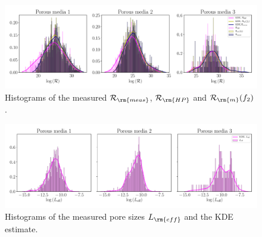 \documentclass[draft,jgrga]{agutexSI2019}
\begin{document}
\begin{figure}
\noindent\includegraphics[width=15cm]{figures/hydraulic_resistance_integrated_histogram.pdf}
\caption{Histograms of the measured $\mathcal{R}_{\rm{meas}}$, $\mathcal{R}_{\rm{HP}}$ and $\mathcal{R}_{\rm{m}}(f_2)$ . }\label{Fig:Hist_1}
\end{figure}

\begin{figure}
\noindent\includegraphics[width=15cm]{figures/Leff_integrated_histogram.pdf}
\caption{Histograms of the measured pore sizes $L_{\rm{eff}}$ and the KDE estimate. }\label{Fig:Hist_2}
\end{figure}



\end{document}
